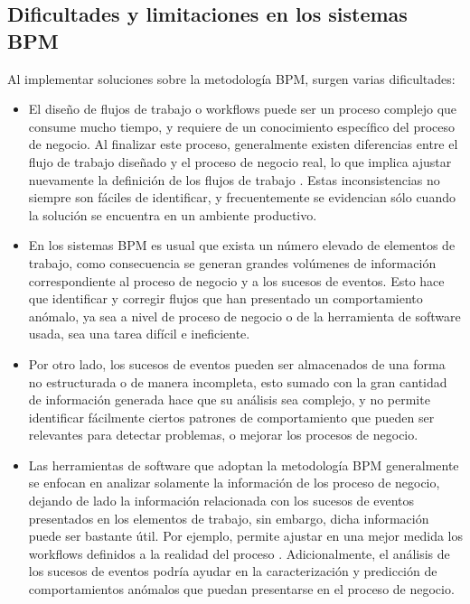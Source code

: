 \subsection{Dificultades y limitaciones en los sistemas BPM} %
\label{section1.2.1}

Al implementar soluciones sobre la metodología BPM, surgen varias dificultades:

\begin{itemize}
    \item El diseño de flujos de trabajo o workflows puede ser un proceso complejo que consume mucho tiempo, y requiere de un conocimiento específico del proceso de negocio. Al finalizar este proceso, generalmente existen diferencias entre el flujo de trabajo diseñado y el proceso de negocio real, lo que implica ajustar nuevamente la definición de los flujos de trabajo \cite{VanDerAalst2004_2}. Estas inconsistencias no siempre son fáciles de identificar, y frecuentemente se evidencian sólo cuando la solución se encuentra en un ambiente productivo.
    
    \item En los sistemas BPM es usual que exista un número elevado de elementos de trabajo, como consecuencia se generan grandes volúmenes de información correspondiente al proceso de negocio y a los sucesos de eventos. Esto hace que identificar y corregir flujos que han presentado un comportamiento anómalo, ya sea a nivel de proceso de negocio o de la herramienta de software usada, sea una tarea difícil e ineficiente.
    
    \item Por otro lado, los sucesos de eventos pueden ser almacenados de una forma no estructurada o de manera incompleta, esto sumado con la gran cantidad de información generada hace que su análisis sea complejo, y no permite identificar fácilmente ciertos patrones de comportamiento que pueden ser relevantes para detectar problemas, o mejorar los procesos de negocio.
    
    \item Las herramientas de software que adoptan la metodología BPM generalmente se enfocan en analizar solamente la información de los proceso de negocio, dejando de lado la información relacionada con los sucesos de eventos presentados en los elementos de trabajo, sin embargo, dicha información puede ser bastante útil. Por ejemplo, permite ajustar en una mejor medida los workflows definidos a la realidad del proceso \cite{VanDerAalst2004_2}. Adicionalmente, el análisis de los sucesos de eventos podría ayudar en la caracterización y predicción de comportamientos anómalos que puedan presentarse en el proceso de negocio.
    
\end{itemize}

